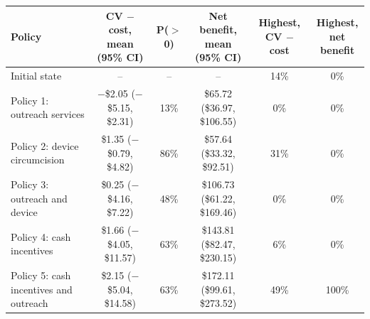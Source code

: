 \begin{tabular}{>{\raggedright\arraybackslash}p{3.2cm}ccccc}
\toprule
Policy & \makecell{CV $-$ cost, mean\\(95\% CI)} & P($>$0) & \makecell{Net benefit, mean\\(95\% CI)} & \makecell{Highest,\\CV $-$ cost} & \makecell{Highest,\\net benefit}
\\
\midrule
Initial state & -- & -- & -- & 14\% & 0\% \\
Policy 1: outreach services & \makecell{$-$\$2.05 \\ {\footnotesize ($-$\$5.15, \$2.31)}} & 13\% & \makecell{\$65.72 \\ {\footnotesize (\$36.97, \$106.55)}} & 0\% & 0\% \\
Policy 2: device circumcision & \makecell{\$1.35 \\ {\footnotesize ($-$\$0.79, \$4.82)}} & 86\% & \makecell{\$57.64 \\ {\footnotesize (\$33.32, \$92.51)}} & 31\% & 0\% \\
Policy 3: outreach and device & \makecell{\$0.25 \\ {\footnotesize ($-$\$4.16, \$7.22)}} & 48\% & \makecell{\$106.73 \\ {\footnotesize (\$61.22, \$169.46)}} & 0\% & 0\% \\
Policy 4: cash incentives & \makecell{\$1.66 \\ {\footnotesize ($-$\$4.05, \$11.57)}} & 63\% & \makecell{\$143.81 \\ {\footnotesize (\$82.47, \$230.15)}} & 6\% & 0\% \\
Policy 5: cash incentives and outreach & \makecell{\$2.15 \\ {\footnotesize ($-$\$5.04, \$14.58)}} & 63\% & \makecell{\$172.11 \\ {\footnotesize (\$99.61, \$273.52)}} & 49\% & 100\% \\
\bottomrule
\end{tabular}
